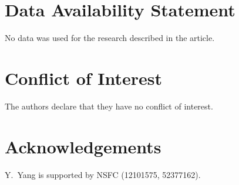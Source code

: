 \documentclass[12pt,a4paper]{amsart}
\theoremstyle{definition}
\begin{document}
\section*{Data Availability Statement}

No data was used for the research described in the article.

\section*{Conflict of Interest}

The authors declare that they have no conflict of interest.

\section*{Acknowledgements}
				
Y.~Yang is supported by NSFC (12101575, 52377162).
								
\end{document}
